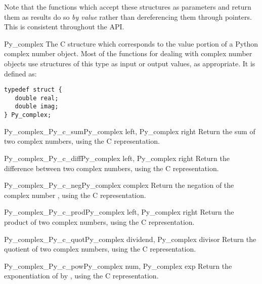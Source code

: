 Note that the functions which accept these structures as parameters
and return them as results do so \emph{by value} rather than
dereferencing them through pointers.  This is consistent throughout
the API.

\begin{ctypedesc}{Py_complex}
  The C structure which corresponds to the value portion of a Python
  complex number object.  Most of the functions for dealing with
  complex number objects use structures of this type as input or
  output values, as appropriate.  It is defined as:

\begin{verbatim}
typedef struct {
   double real;
   double imag;
} Py_complex;
\end{verbatim}
\end{ctypedesc}

\begin{cfuncdesc}{Py_complex}{_Py_c_sum}{Py_complex left, Py_complex right}
  Return the sum of two complex numbers, using the C
   representation.
\end{cfuncdesc}

\begin{cfuncdesc}{Py_complex}{_Py_c_diff}{Py_complex left, Py_complex right}
  Return the difference between two complex numbers, using the C
   representation.
\end{cfuncdesc}

\begin{cfuncdesc}{Py_complex}{_Py_c_neg}{Py_complex complex}
  Return the negation of the complex number , using the C
   representation.
\end{cfuncdesc}

\begin{cfuncdesc}{Py_complex}{_Py_c_prod}{Py_complex left, Py_complex right}
  Return the product of two complex numbers, using the C
   representation.
\end{cfuncdesc}

\begin{cfuncdesc}{Py_complex}{_Py_c_quot}{Py_complex dividend,
                                          Py_complex divisor}
  Return the quotient of two complex numbers, using the C
   representation.
\end{cfuncdesc}

\begin{cfuncdesc}{Py_complex}{_Py_c_pow}{Py_complex num, Py_complex exp}
  Return the exponentiation of  by , using the C
   representation.
\end{cfuncdesc}


